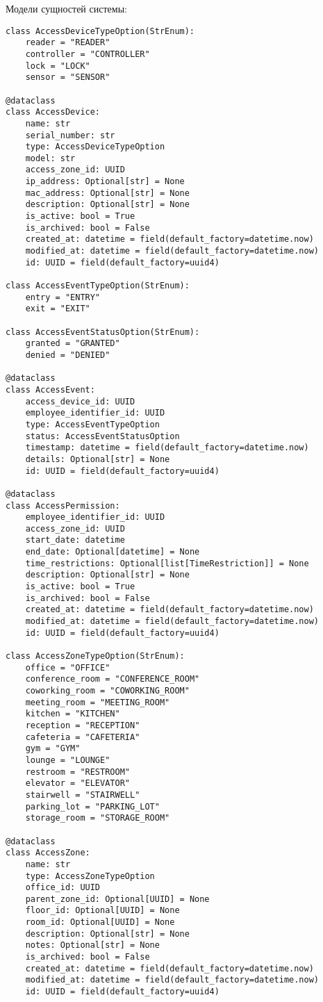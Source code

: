 \noindent
Модели сущностей системы:

\begin{lstlisting}[style=pythonstyle]
class AccessDeviceTypeOption(StrEnum):
    reader = "READER"
    controller = "CONTROLLER"
    lock = "LOCK"
    sensor = "SENSOR"

@dataclass
class AccessDevice:
    name: str
    serial_number: str
    type: AccessDeviceTypeOption
    model: str
    access_zone_id: UUID
    ip_address: Optional[str] = None
    mac_address: Optional[str] = None
    description: Optional[str] = None
    is_active: bool = True
    is_archived: bool = False
    created_at: datetime = field(default_factory=datetime.now)
    modified_at: datetime = field(default_factory=datetime.now)
    id: UUID = field(default_factory=uuid4)

class AccessEventTypeOption(StrEnum):
    entry = "ENTRY"
    exit = "EXIT"

class AccessEventStatusOption(StrEnum):
    granted = "GRANTED"
    denied = "DENIED"

@dataclass
class AccessEvent:
    access_device_id: UUID
    employee_identifier_id: UUID
    type: AccessEventTypeOption
    status: AccessEventStatusOption
    timestamp: datetime = field(default_factory=datetime.now)
    details: Optional[str] = None
    id: UUID = field(default_factory=uuid4)

@dataclass
class AccessPermission:
    employee_identifier_id: UUID
    access_zone_id: UUID
    start_date: datetime
    end_date: Optional[datetime] = None
    time_restrictions: Optional[list[TimeRestriction]] = None
    description: Optional[str] = None
    is_active: bool = True
    is_archived: bool = False
    created_at: datetime = field(default_factory=datetime.now)
    modified_at: datetime = field(default_factory=datetime.now)
    id: UUID = field(default_factory=uuid4)

class AccessZoneTypeOption(StrEnum):
    office = "OFFICE"
    conference_room = "CONFERENCE_ROOM"
    coworking_room = "COWORKING_ROOM"
    meeting_room = "MEETING_ROOM"
    kitchen = "KITCHEN"
    reception = "RECEPTION"
    cafeteria = "CAFETERIA"
    gym = "GYM"
    lounge = "LOUNGE"
    restroom = "RESTROOM"
    elevator = "ELEVATOR"
    stairwell = "STAIRWELL"
    parking_lot = "PARKING_LOT"
    storage_room = "STORAGE_ROOM"

@dataclass
class AccessZone:
    name: str
    type: AccessZoneTypeOption
    office_id: UUID
    parent_zone_id: Optional[UUID] = None
    floor_id: Optional[UUID] = None
    room_id: Optional[UUID] = None
    description: Optional[str] = None
    notes: Optional[str] = None
    is_archived: bool = False
    created_at: datetime = field(default_factory=datetime.now)
    modified_at: datetime = field(default_factory=datetime.now)
    id: UUID = field(default_factory=uuid4)


\end{lstlisting}
